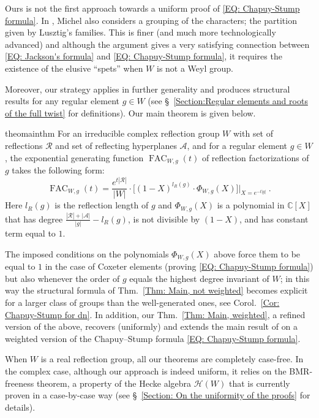\documentclass[ALCO, Unicode]{cedram}
\newcommand{\op}[1]{\operatorname{#1}}
\newcommand{\op}[1]{\operatorname{#1}}
\begin{document}
Ours is not the first approach towards a uniform proof of \eqref{EQ: Chapuy-Stump formula}. In \cite{michel-deligne-lusztig-derivation}, Michel also considers a grouping of the characters; the partition given by Lusztig's families. This is finer (and much more technologically advanced) and although the argument gives a very satisfying connection between \eqref{EQ: Jackson's formula} and \eqref{EQ: Chapuy-Stump formula}, it requires the existence of the elusive ``spets'' \cite{broue-malle-michel-split-spetses} when $W$ is not a Weyl group.

Moreover, our strategy applies in further generality and produces structural results for any regular element $g\in W$ (see \S~\ref{Section:Regular elements and roots of the full twist} for definitions). Our main theorem is given below.

\begin{restatable*}[]{theo}{mainthm}
\label{Thm: Main, not weighted}
For an irreducible complex reflection group $W$ with set of reflections $\mathcal{R}$ and set of reflecting hyperplanes $\mathcal{A}$, and for a regular element $g\in W$, the exponential generating function $\op{FAC}_{W,g}(t)$ of reflection factorizations of $g$ takes the following form:$$
\op{FAC}_{W,g}(t)=\dfrac{e^{t|\mathcal{R}|}}{|W|}\cdot \Big[ (1-X)^{l_R(g)}\cdot\Phi_{W,g}(X)\Big]\Big|_{X=e^{-t|g|}}\ .$$ Here $l_R(g)$ is the reflection length of $g$ and $\Phi_{W,g}(X)$ is a polynomial in $\mathbb{C}[X]$ that has degree $\frac{|\mathcal{R}|+|\mathcal{A}|}{|g|}-l_R(g)$, is not divisible by $(1-X)$, and has constant term equal to $1$.
\end{restatable*}


The imposed conditions on the polynomials $\Phi_{W,g}(X)$ above force them to be equal to $1$ in the case of Coxeter elements (proving \eqref{EQ: Chapuy-Stump formula}) but also whenever the order of $g$ equals the highest degree invariant of $W$; in this way the structural formula of Thm.~\ref{Thm: Main, not weighted} becomes explicit for a larger class of groups than the well-generated ones, see Corol.~\ref{Cor: Chapuy-Stump for dn}. 
In addition, our Thm.~\ref{Thm: Main, weighted}, a refined version of the above, recovers (uniformly) and extends the main result of \cite{reiner-delMas-Hameister} on a weighted version of the Chapuy--Stump formula \eqref{EQ: Chapuy-Stump formula}.



When $W$ is a real reflection group, all our theorems are completely case-free. In the complex case, although our approach is indeed uniform, it relies on the BMR-freeness theorem, a property of the Hecke algebra $\mathcal{H}(W)$ that is currently proven in a case-by-case way (see \S~\ref{Section: On the uniformity of the proofs} for details).
\end{document}
